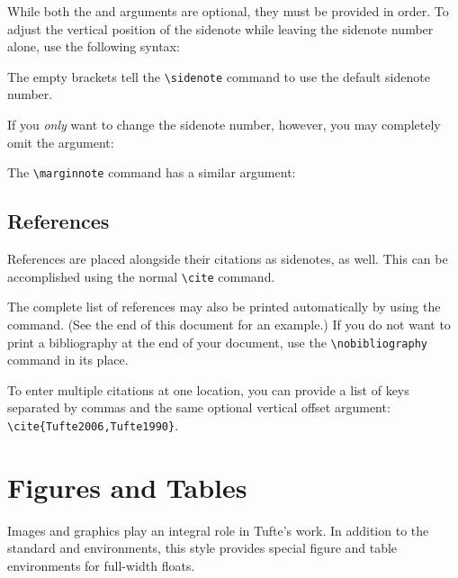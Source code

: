 \documentclass{tufte-handout}
\begin{document}
While both the  and  arguments are optional, they
must be provided in order.  To adjust the vertical position of the sidenote
while leaving the sidenote number alone, use the following syntax:
\begin{docspec}
\end{docspec}
The empty brackets tell the \Verb|\sidenote| command to use the default
sidenote number.

If you \emph{only} want to change the sidenote number, however, you may
completely omit the  argument:
\begin{docspec}
\end{docspec}

The \Verb|\marginnote| command has a similar  argument:
\begin{docspec}
\end{docspec}

\subsection{References}
References are placed alongside their citations as sidenotes,
as well.  This can be accomplished using the normal \Verb|\cite|
command.

The complete list of references may also be printed automatically by using
the \Verb|| command.  (See the end of this document for an
example.)  If you do not want to print a bibliography at the end of your
document, use the \Verb|\nobibliography| command in its place.

To enter multiple citations at one location,\cite{Tufte2006,Tufte1990} you can
provide a list of keys separated by commas and the same optional vertical
offset argument: \Verb|\cite{Tufte2006,Tufte1990}|.
\begin{docspec}
\end{docspec}

\section{Figures and Tables}\label{sec:figures-and-tables}
Images and graphics play an integral role in Tufte's work.
In addition to the standard  and  environments,
this style provides special figure and table environments for full-width
floats.
\end{document}
